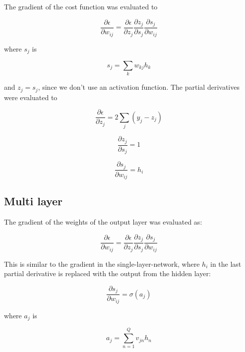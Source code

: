 \documentclass{article}
\begin{document}
The gradient of the cost function was evaluated to

\begin{equation}
  \frac{\partial \epsilon}{\partial w_{ij}} =
  \frac{\partial \epsilon}{\partial z_j}
  \frac{\partial z_j}{\partial s_j}
  \frac{\partial s_j}{\partial w_{ij}}
\end{equation}

where $s_j$ is

\begin{equation}
  s_j = \sum_{k}{w_{kj}h_k}
\end{equation}

and $z_j = s_j$, since we don't use an activation function.
The partial derivatives were evaluated to

\begin{equation}
    \frac{\partial \epsilon}{\partial z_j} = 2\sum_j(y_j - z_j)
\end{equation}

\begin{equation}
    \frac{\partial z_j}{\partial s_j} = 1
\end{equation}

\begin{equation}
    \frac{\partial s_j}{\partial w_{ij}} = h_i
\end{equation}

\subsection{Multi layer}

The gradient of the weights of the output layer was evaluated as:

\begin{equation}
  \frac{\partial \epsilon}{\partial w_{ij}} =
  \frac{\partial \epsilon}{\partial z_j}
  \frac{\partial z_j}{\partial s_j}
  \frac{\partial s_j}{\partial w_{ij}}
\end{equation}

This is similar to the gradient in the single-layer-network, where $h_i$
in the last partial derivative is replaced with the output from the hidden
layer:

\begin{equation}
    \frac{\partial s_j}{\partial w_{ij}} = \sigma(a_j)
\end{equation}

where $a_j$ is 

\begin{equation}
    a_j = \sum_{n=1}^Q v_{jn}h_n
\end{equation}
\end{document}
